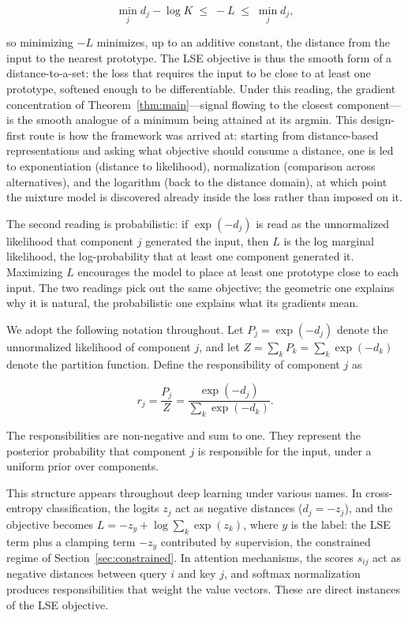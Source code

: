 \[
\min_j d_j - \log K \;\leq\; -L \;\leq\; \min_j d_j,
\]

so minimizing $-L$ minimizes, up to an additive constant, the distance from the input to the nearest prototype. The LSE objective is thus the smooth form of a distance-to-a-set: the loss that requires the input to be close to at least one prototype, softened enough to be differentiable. Under this reading, the gradient concentration of Theorem~\ref{thm:main}---signal flowing to the closest component---is the smooth analogue of a minimum being attained at its argmin. This design-first route is how the framework was arrived at: starting from distance-based representations and asking what objective should consume a distance, one is led to exponentiation (distance to likelihood), normalization (comparison across alternatives), and the logarithm (back to the distance domain), at which point the mixture model is discovered already inside the loss rather than imposed on it.

The second reading is probabilistic: if $\exp(-d_j)$ is read as the unnormalized likelihood that component $j$ generated the input, then $L$ is the log marginal likelihood, the log-probability that at least one component generated it. Maximizing $L$ encourages the model to place at least one prototype close to each input. The two readings pick out the same objective; the geometric one explains why it is natural, the probabilistic one explains what its gradients mean.

We adopt the following notation throughout. Let $P_j = \exp(-d_j)$ denote the unnormalized likelihood of component $j$, and let $Z = \sum_k P_k = \sum_k \exp(-d_k)$ denote the partition function. Define the responsibility of component $j$ as

\begin{equation}
r_j = \frac{P_j}{Z} = \frac{\exp(-d_j)}{\sum_k \exp(-d_k)}.
\end{equation}

The responsibilities are non-negative and sum to one. They represent the posterior probability that component $j$ is responsible for the input, under a uniform prior over components.

This structure appears throughout deep learning under various names. In cross-entropy classification, the logits $z_j$ act as negative distances ($d_j = -z_j$), and the objective becomes $L = -z_y + \log \sum_k \exp(z_k)$, where $y$ is the label: the LSE term plus a clamping term $-z_y$ contributed by supervision, the constrained regime of Section~\ref{sec:constrained}. In attention mechanisms, the scores $s_{ij}$ act as negative distances between query $i$ and key $j$, and softmax normalization produces responsibilities that weight the value vectors. These are direct instances of the LSE objective.

